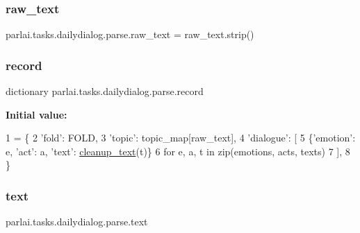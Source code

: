 \subsubsection{\texorpdfstring{raw\+\_\+text}{raw\_text}}
{\footnotesize\ttfamily parlai.\+tasks.\+dailydialog.\+parse.\+raw\+\_\+text = raw\+\_\+text.\+strip()}

\mbox{\label{namespaceparlai_1_1tasks_1_1dailydialog_1_1parse_a0774e7d0e2917f02dec4999e17c26eee}} 
\subsubsection{\texorpdfstring{record}{record}}
{\footnotesize\ttfamily dictionary parlai.\+tasks.\+dailydialog.\+parse.\+record}

{\bfseries Initial value\+:}
\begin{DoxyCode}
1 =  \{
2         \textcolor{stringliteral}{'fold'}: FOLD,
3         \textcolor{stringliteral}{'topic'}: topic\_map[raw\_text],
4         \textcolor{stringliteral}{'dialogue'}: [
5             \{\textcolor{stringliteral}{'emotion'}: e, \textcolor{stringliteral}{'act'}: a, \textcolor{stringliteral}{'text'}: \hyperlink{namespaceparlai_1_1tasks_1_1dailydialog_1_1parse_a9bee736957d0b4eb0a046855faa821dc}{cleanup\_text}(t)\}
6             \textcolor{keywordflow}{for} e, a, t \textcolor{keywordflow}{in} zip(emotions, acts, texts)
7         ],
8     \}
\end{DoxyCode}
\mbox{\label{namespaceparlai_1_1tasks_1_1dailydialog_1_1parse_ad0b494b4bb78b7da65dba688516fd065}} 
\subsubsection{\texorpdfstring{text}{text}}
{\footnotesize\ttfamily parlai.\+tasks.\+dailydialog.\+parse.\+text}

\mbox{\label{namespaceparlai_1_1tasks_1_1dailydialog_1_1parse_ad9c36b3a53f03612c29b79525a210c75}} 

